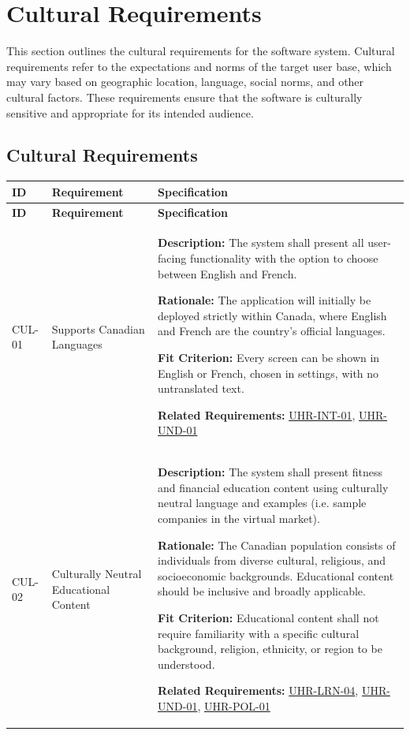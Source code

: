 \documentclass[12pt]{article}
\begin{document}
\section{Cultural Requirements}

This section outlines the cultural requirements for the software system. Cultural requirements refer to the expectations and norms of the target user base, which may vary based on geographic location, language, social norms, and other cultural factors. These requirements ensure that the software is culturally sensitive and appropriate for its intended audience.

\subsection{Cultural Requirements}

\small
\setlength{\tabcolsep}{4pt}
\begin{xltabular}{\textwidth}{|p{2.6cm}|p{3.4cm}|X|}
\hline
\textbf{ID} & \textbf{Requirement} & \textbf{Specification} \\
\hline
\endfirsthead
\hline
\textbf{ID} & \textbf{Requirement} & \textbf{Specification} \\
\hline
\endhead

CUL-01\hypertarget{req:CUL-01}{} & 
Supports Canadian Languages & 
\textbf{Description:} The system shall present all user-facing functionality with the option to choose between English and French. 

\textbf{Rationale:} The application will initially be deployed strictly within Canada, where English and French are the country's official languages. 

\textbf{Fit Criterion:} Every screen can be shown in English or French, chosen in settings, with no untranslated text.

\textbf{Related Requirements:} \hyperlink{req:UHR-INT-01}{UHR-INT-01}, \hyperlink{req:UHR-UND-01}{UHR-UND-01}\\
\hline

CUL-02\hypertarget{req:CUL-02}{} & 
Culturally Neutral Educational Content & 
\textbf{Description:} The system shall present fitness and financial education content using culturally neutral language and examples (i.e. sample companies in the virtual market). 

\textbf{Rationale:} The Canadian population consists of individuals from diverse cultural, religious, and socioeconomic backgrounds. Educational content should be inclusive and broadly applicable. 

\textbf{Fit Criterion:} Educational content shall not require familiarity with a specific cultural background, religion, ethnicity, or region to be understood.

\textbf{Related Requirements:} \hyperlink{req:UHR-LRN-04}{UHR-LRN-04}, \hyperlink{req:UHR-UND-01}{UHR-UND-01}, \hyperlink{req:UHR-POL-01}{UHR-POL-01}\\
\hline

\end{xltabular}
\end{document}

